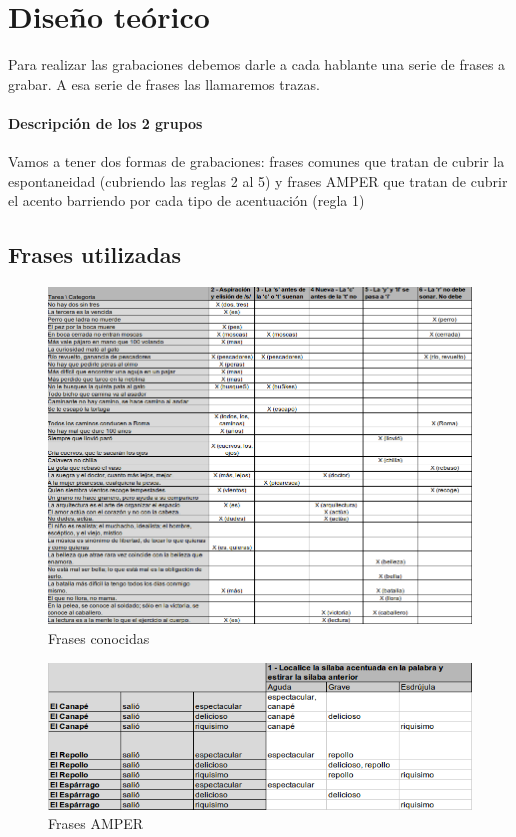 \documentclass[11pt,a4paper,twoside]{tesis}
\begin{document}
\section{Diseño teórico}

Para realizar las grabaciones debemos darle a cada hablante una serie de frases a grabar. A esa serie de frases las llamaremos trazas.

\paragraph{Descripción de los 2 grupos}

Vamos a tener dos formas de grabaciones: frases comunes que tratan de cubrir la espontaneidad (cubriendo las reglas 2 al 5) y frases AMPER que tratan de cubrir el acento barriendo por cada tipo de acentuación (regla 1)

\subsection{Frases utilizadas}

\begin{figure}[h!]
    \centerline{\includegraphics[width=1\textwidth]{frases_inf} }
    \caption{Frases conocidas}
\end{figure}

\begin{figure}[h!]
    \centerline{\includegraphics[width=1\textwidth]{reglas_AMPER} }
    \caption{Frases AMPER}
\end{figure}
\end{document}
